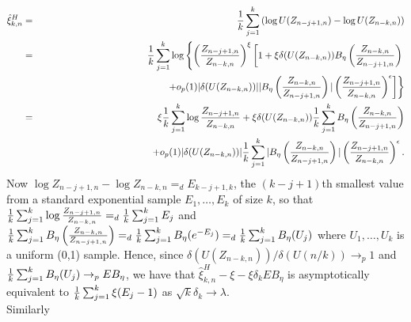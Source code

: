 \documentclass[twoside,leqno,11pt]{article}
\begin{document}
\begin{eqnarray*}
\hat{\xi}^H_{k,n} &=& {1 \over k}\sum_{j=1}^k
\left(\log U(Z_{n-j+1,n})- \log U(Z_{n-k,n}) \right) \\
&=& {1 \over k}\sum_{j=1}^k \log \left\{
\left({Z_{n-j+1,n}\over Z_{n-k,n}}\right)^\xi 
\left[
1+\xi \delta (U(Z_{n-k,n}))B_\eta \left( {Z_{n-k,n} \over Z_{n-j+1,n}}\right) \right. \right. \\
&& \hspace{4.6cm}\left.\left.
+o_p(1)|\delta (U(Z_{n-k,n}))| |B_\eta \left( {Z_{n-k,n} \over Z_{n-j+1,n}}\right)| \left({Z_{n-j+1,n}\over Z_{n-k,n}}\right)^\epsilon 
\right]
\right\}\\
&=& \xi {1 \over k}\sum_{j=1}^k \log {Z_{n-j+1,n}\over Z_{n-k,n}}
+ \xi \delta (U(Z_{n-k,n}))  {1 \over k}\sum_{j=1}^k B_\eta \left( {Z_{n-k,n} \over Z_{n-j+1,n}}\right)\\
&& \hspace{3.5cm}
+o_p(1)|\delta (U(Z_{n-k,n}))|  {1 \over k}\sum_{j=1}^k |B_\eta \left( {Z_{n-k,n} \over Z_{n-j+1,n}}\right)| \left({Z_{n-j+1,n}\over Z_{n-k,n}}\right)^\epsilon. 
\end{eqnarray*}
Now $\log Z_{n-j+1,n}-\log Z_{n-k,n} =_d E_{k-j+1,k}$, the $(k-j+1)$th smallest value from a standard exponential sample $E_1,\ldots,E_k$ of size $k$, so that ${1 \over k}\sum_{j=1}^k \log {Z_{n-j+1,n}\over Z_{n-k,n}}=_d {1 \over k}\sum_{j=1}^k E_j$ and ${1 \over k}\sum_{j=1}^k B_\eta \left( {Z_{n-k,n} \over Z_{n-j+1,n}}\right) =_d {1 \over k}\sum_{j=1}^k B_\eta (e^{-E_j})=_d {1 \over k}\sum_{j=1}^k B_\eta (U_j)$ where $U_1,\ldots,U_k$ is a uniform (0,1) sample. Hence, since $\delta (U(Z_{n-k,n})) / \delta (U(n/k)) \to_p 1$ and  ${1 \over k}\sum_{j=1}^k B_\eta (U_j) \to_p EB_{\eta}$, we have that $\hat{\xi}^H_{k,n} -\xi - \xi \delta_k EB_\eta$ is asymptotically equivalent to $ {1 \over k}\sum_{j=1}^k \xi (E_j-1)$ as $\sqrt{k} \delta_k \to \lambda$. \\
Similarly 
\end{document}
